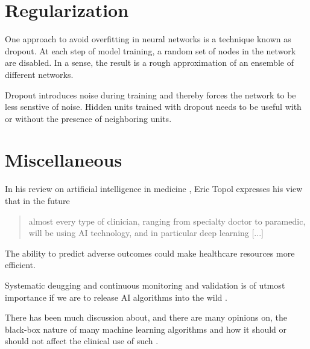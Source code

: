 \section{Regularization}

One approach to avoid overfitting in neural networks
is a technique known as dropout.
At each step of model training,
a random set of nodes in the network are disabled.
In a sense, the result is a rough approximation of 
an ensemble of different networks.


Dropout introduces noise during training
and thereby forces the network to be less senstive of noise.
Hidden units trained with dropout needs to be useful 
with or without the presence of neighboring units.


\section{Miscellaneous}

In his review on artificial intelligence in medicine%
\autocite{topolHighperformance2019}, 
Eric Topol expresses his view that in the future
\blockquote{%
almost every type of clinician, ranging from specialty doctor to paramedic,
will be using AI technology, and in particular deep learning [...]
}.

The ability to predict adverse outcomes could make  
healthcare resources more efficient.

Systematic deugging and continuous monitoring and validation 
is of utmost importance if we are to release AI algorithms into the wild%
\autocite{topolHighperformance2019}.

There has been much discussion about, and there are many opinions on, 
the black-box nature of many machine learning algorithms and 
how it should or should not affect the clinical use of such 
\autocite{topolHighperformance2019, gunningXAI2019, vanderveldenExplainable2022}.
